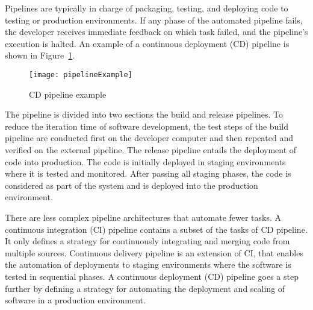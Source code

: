 Pipelines are typically in charge of packaging, testing, and deploying code to testing or production environments.
If any phase of the automated pipeline fails, the developer receives immediate feedback on which task failed, and the pipeline's execution is halted.
An example of a continuous deployment (CD) pipeline is shown in Figure~\ref{fig:pipeline_example}.

\begin{figure}[htbp]
    \centering
    \texttt{[image: pipelineExample]}
    \caption{CD pipeline example}
    \label{fig:pipeline_example}
\end{figure}

The pipeline is divided into two sections the build and release pipelines.
To reduce the iteration time of software development,
the test steps of the build pipeline are conducted first on the developer computer and then repeated and verified on the external pipeline.
The release pipeline entails the deployment of code into production.
The code is initially deployed in staging environments where it is tested and monitored.
After passing all staging phases, the code is considered as part of the system and is deployed into the production environment.

There are less complex pipeline architectures that automate fewer tasks.
A continuous integration (CI) pipeline contains a subset of the tasks of CD pipeline.
It only defines a strategy for continuously integrating and merging code from multiple sources.
Continuous delivery pipeline is an extension of CI, that enables the automation of deployments to staging environments where the software is tested in sequential phases.
A continuous deployment (CD) pipeline goes a step further by defining a strategy for automating the deployment and scaling of software in a production environment.




